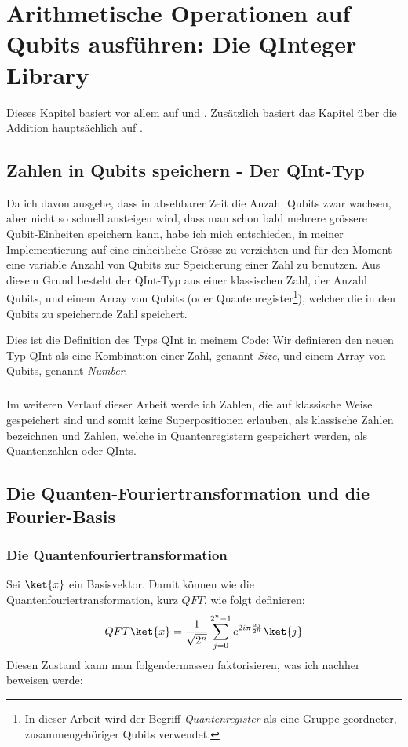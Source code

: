 \chapter{Arithmetische Operationen auf Qubits ausführen: Die QInteger Library}
Dieses Kapitel basiert vor allem auf \cite{AROP} und \cite{QC}. Zusätzlich basiert das Kapitel über die Addition hauptsächlich auf \cite{ADFT}.

\section{Zahlen in Qubits speichern - Der QInt-Typ}
Da ich davon ausgehe, dass in absehbarer Zeit die Anzahl Qubits zwar wachsen, aber nicht so schnell ansteigen wird, dass man schon bald mehrere grössere Qubit-Einheiten speichern kann, habe ich mich entschieden, in meiner Implementierung auf eine einheitliche Grösse zu verzichten und für den Moment eine variable Anzahl von Qubits zur Speicherung einer Zahl zu benutzen. Aus diesem Grund besteht der QInt-Typ aus einer klassischen Zahl, der Anzahl Qubits, und einem Array von Qubits (oder Quantenregister\footnote{In dieser Arbeit wird der Begriff \textit{Quantenregister} als eine Gruppe geordneter, zusammengehöriger Qubits verwendet.}), welcher die in den Qubits zu speichernde Zahl speichert.



Dies ist die Definition des Typs QInt in meinem Code: Wir definieren den neuen Typ \grqq QInt\grqq{} als eine Kombination einer Zahl, genannt \textit{Size}, und einem Array von Qubits, genannt \textit{Number}.

\paragraph{}

Im weiteren Verlauf dieser Arbeit werde ich Zahlen, die auf klassische Weise gespeichert sind und somit keine Superpositionen erlauben, als \grqq klassische Zahlen\grqq{} bezeichnen und Zahlen, welche in Quantenregistern gespeichert werden, als \grqq Quantenzahlen\grqq{} oder \grqq QInts\grqq{}.

\section{Die Quanten-Fouriertransformation und die Fourier-Basis}
\subsection{Die Quantenfouriertransformation}
Sei $\ket{x}$ ein Basisvektor. Damit können wie die Quantenfouriertransformation, kurz $QFT$, wie folgt definieren:
$$QFT\ket{x} = \frac{1}{\sqrt{2^n}}\sum^{2^n - 1}_{j = 0}e^{2i\pi\frac{xj}{2^n}}\ket{j}$$
Diesen Zustand kann man folgendermassen faktorisieren, was ich nachher beweisen werde:

